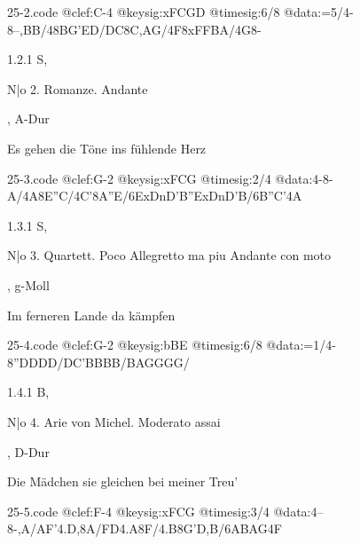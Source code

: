 \documentclass[a4paper, twocolumn, 11pt]{book}
\begin{document}
\begin{filecontents*}{25-2.code}
@clef:C-4
@keysig:xFCGD
@timesig:6/8
@data:=5/4-8--,BB/48BG'ED/DC{8C,AG}/4F8xF{FBA}/4G8-
\end{filecontents*}
\newline %
\par 1.2.1  S, \begin{itshape}N|o 2. Romanze. Andante\end{itshape}, A-Dur\newline \begin{footnotesize} Es gehen die Töne ins fühlende Herz \end{footnotesize}  
\begin{filecontents*}{25-3.code}
@clef:G-2
@keysig:xFCG
@timesig:2/4
@data:4-8-A/4A8E''C/4C'8A''E/{6ExDnD'B}{''ExDnD'B}/{6B''C}'4A
\end{filecontents*}
\newline %
\par 1.3.1  S, \begin{itshape}N|o 3. Quartett. Poco Allegretto ma piu Andante con moto\end{itshape}, g-Moll\newline \begin{footnotesize} Im ferneren Lande da kämpfen \end{footnotesize}  
\begin{filecontents*}{25-4.code}
@clef:G-2
@keysig:bBE
@timesig:6/8
@data:=1/4-8''DDDD/DC'BBBB/BAGGGG/
\end{filecontents*}
\newline %
\par 1.4.1  B, \begin{itshape}N|o 4. Arie von Michel. Moderato assai\end{itshape}, D-Dur\newline \begin{footnotesize} Die Mädchen sie gleichen bei meiner Treu' \end{footnotesize}  
\begin{filecontents*}{25-5.code}
@clef:F-4
@keysig:xFCG
@timesig:3/4
@data:4--8-,A/{AF}'4.D,8A/{FD}4.A8F/4.B8G'{D,B}/{6ABAG}4F
\end{filecontents*}
\end{document}
